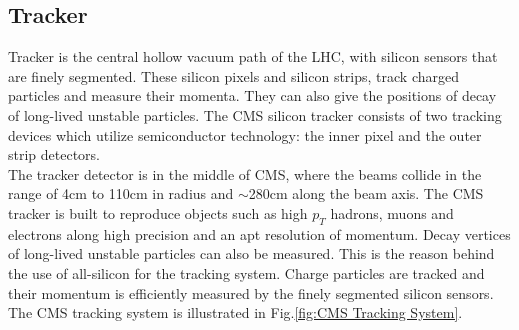 \subsection{Tracker}
Tracker is the central hollow vacuum path of the LHC, with silicon sensors that are finely segmented. These silicon pixels and silicon strips, track charged particles and measure their momenta. They can also give the positions of decay of long-lived unstable particles. The CMS silicon tracker consists of two tracking devices which utilize semiconductor technology: the inner pixel and the outer strip detectors.\\
The tracker detector is in the middle of CMS, where the beams collide in the range of 4cm to 110cm in radius and $\sim$280cm along the beam axis. The CMS tracker is built to reproduce objects such as high $p_{T}$ hadrons, muons and electrons along high precision and an apt resolution of momentum. Decay vertices of long-lived unstable particles can also be measured. This is the reason behind the use of all-silicon for the tracking system. Charge particles are tracked and their momentum is efficiently measured by the finely segmented silicon sensors. The CMS tracking system is illustrated in Fig.\ref{fig:CMS Tracking System}.
